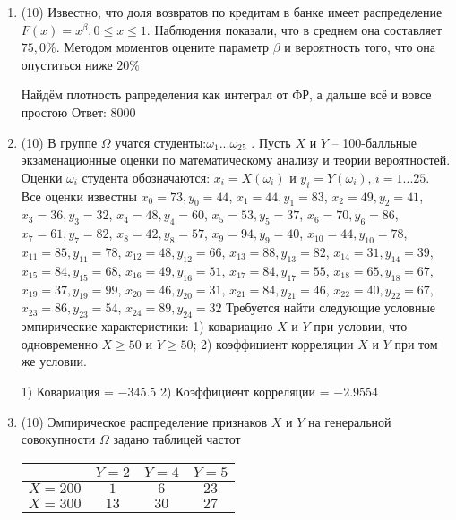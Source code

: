 \documentclass[a4paper,12pt]{article}
\begin{document}
\begin{enumerate}
\item


(10) Известно, что доля возвратов по кредитам в банке имеет распределение $F(x) = x ^{\beta}, 0 \leqslant x \leqslant 1$.
Наблюдения показали, что в среднем она составляет $75,0\%$. Методом моментов оцените параметр $\beta$ и
вероятность того, что она опуститься ниже $20\%$




Найдём плотность рапределения как интеграл от ФР, а дальше всё и вовсе простою Ответ: $8000$


\item


(10) В группе $\Omega$ учатся студенты:$\omega _{1}...\omega _{25}$ . Пусть $X$ и $Y$ – 100-балльные экзаменационные оценки по
математическому анализу и теории вероятностей. Оценки $\omega _{i}$ студента обозначаются: $x _{i} = X(\omega _{i})$ и $y _{i} = Y(\omega _{i})$, $i = 1...25$. Все оценки известны
$x _{0} = 73, y _{0} = 44$, $x _{1} = 44, y _{1} = 83$, $x _{2} = 49, y _{2} = 41$, $x _{3} = 36, y _{3} = 32$, $x _{4} = 48, y _{4} = 60$, $x _{5} = 53, y _{5} = 37$, $x _{6} = 70, y _{6} = 86$, $x _{7} = 61, y _{7} = 82$, $x _{8} = 42, y _{8} = 57$, $x _{9} = 94, y _{9} = 40$, $x _{10} = 44, y _{10} = 78$, $x _{11} = 85, y _{11} = 78$, $x _{12} = 48, y _{12} = 66$, $x _{13} = 88, y _{13} = 82$, $x _{14} = 31, y _{14} = 39$, $x _{15} = 84, y _{15} = 68$, $x _{16} = 49, y _{16} = 51$, $x _{17} = 84, y _{17} = 55$, $x _{18} = 65, y _{18} = 67$, $x _{19} = 37, y _{19} = 99$, $x _{20} = 46, y _{20} = 31$, $x _{21} = 84, y _{21} = 46$, $x _{22} = 40, y _{22} = 67$, $x _{23} = 86, y _{23} = 54$, $x _{24} = 89, y _{24} = 32$
Требуется
найти следующие условные эмпирические характеристики: 1) ковариацию $X$ и $Y$ при условии, что одновременно $X \geqslant 50$
 и $Y \geqslant 50$; 2) коэффициент корреляции $X$ и $Y$ при том же условии.




1) Ковариация = $-345.5$
2) Коэффициент корреляции = $-2.9554$


\item


(10) Эмпирическое распределение признаков $X$ и $Y$ на генеральной совокупности $\Omega$ задано таблицей частот  
 
\begin{tabular}{ | c | c | c | c | }
\hline
 & $Y = 2$ & $Y = 4$ & $Y = 5$  \\ \hline
$X = 200$ & $1$ & $6$ & $23$\\ \hline
$X = 300$ & $13$ & $30$ & $27$\\
\hline
\end{tabular}


\end{enumerate}
\end{document}
